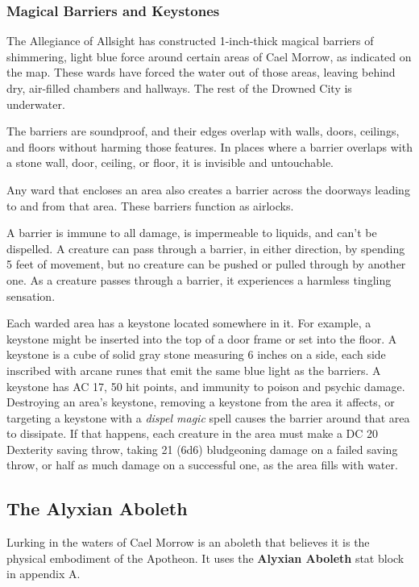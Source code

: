 \documentclass[10pt,a4paper,twoside,bg=print,twocolumn,openany,nodeprecatedcode]{dndbook}
\begin{document}
\subsubsection{Magical Barriers and Keystones}
The Allegiance of Allsight has constructed 1-inch-thick magical barriers of shimmering, light blue force around certain areas of Cael Morrow, as indicated on the map. These wards have forced the water out of those areas, leaving behind dry, air-filled chambers and hallways. The rest of the Drowned City is underwater.

The barriers are soundproof, and their edges overlap with walls, doors, ceilings, and floors without harming those features. In places where a barrier overlaps with a stone wall, door, ceiling, or floor, it is invisible and untouchable.

Any ward that encloses an area also creates a barrier across the doorways leading to and from that area. These barriers function as airlocks.

A barrier is immune to all damage, is impermeable to liquids, and can't be dispelled. A creature can pass through a barrier, in either direction, by spending 5 feet of movement, but no creature can be pushed or pulled through by another one. As a creature passes through a barrier, it experiences a harmless tingling sensation.

Each warded area has a keystone located somewhere in it. For example, a keystone might be inserted into the top of a door frame or set into the floor. A keystone is a cube of solid gray stone measuring 6 inches on a side, each side inscribed with arcane runes that emit the same blue light as the barriers. A keystone has AC 17, 50 hit points, and immunity to poison and psychic damage. Destroying an area's keystone, removing a keystone from the area it affects, or targeting a keystone with a \textit{dispel magic} spell causes the barrier around that area to dissipate. If that happens, each creature in the area must make a DC 20 Dexterity saving throw, taking 21 (6d6) bludgeoning damage on a failed saving throw, or half as much damage on a successful one, as the area fills with water.

\subsection{The Alyxian Aboleth}
Lurking in the waters of Cael Morrow is an aboleth that believes it is the physical embodiment of the Apotheon. It uses the \textbf{Alyxian Aboleth} stat block in appendix A.
\end{document}

